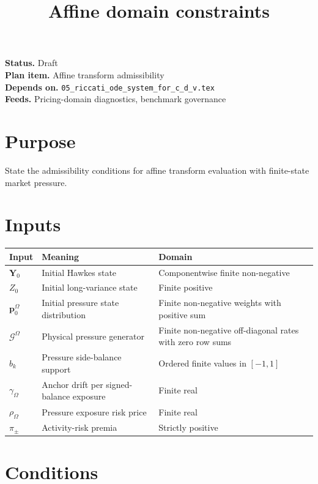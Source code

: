 \documentclass[11pt]{article}
\title{Affine domain constraints}
\author{}
\date{}
\begin{document}
\maketitle

\noindent\textbf{Status.} Draft\\
\textbf{Plan item.} Affine transform admissibility\\
\textbf{Depends on.} \texttt{05\_riccati\_ode\_system\_for\_c\_d\_v.tex}\\
\textbf{Feeds.} Pricing-domain diagnostics, benchmark governance

\section{Purpose}

State the admissibility conditions for affine transform evaluation with
finite-state market pressure.

\section{Inputs}

\begin{tabularx}{\textwidth}{lXX}
\toprule
Input & Meaning & Domain\\
\midrule
\(\mathbf Y_0\) & Initial Hawkes state & Componentwise finite non-negative\\
\(Z_0\) & Initial long-variance state & Finite positive\\
\(\mathbf p^\Omega_0\) & Initial pressure state distribution & Finite non-negative weights with positive sum\\
\(\mathcal G^\Omega\) & Physical pressure generator & Finite non-negative off-diagonal rates with zero row sums\\
\(b_k\) & Pressure side-balance support & Ordered finite values in \([-1,1]\)\\
\(\gamma_\Omega\) & Anchor drift per signed-balance exposure & Finite real\\
\(\rho_\Omega\) & Pressure exposure risk price & Finite real\\
\(\pi_\pm\) & Activity-risk premia & Strictly positive\\
\bottomrule
\end{tabularx}

\section{Conditions}
\end{document}
